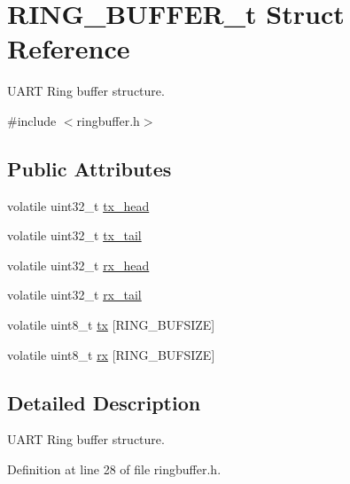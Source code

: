 \hypertarget{struct_r_i_n_g___b_u_f_f_e_r__t}{\section{\-R\-I\-N\-G\-\_\-\-B\-U\-F\-F\-E\-R\-\_\-t \-Struct \-Reference}
\label{struct_r_i_n_g___b_u_f_f_e_r__t}
}


\-U\-A\-R\-T \-Ring buffer structure.  




{\ttfamily \#include $<$ringbuffer.\-h$>$}

\subsection*{\-Public \-Attributes}
\begin{DoxyCompactItemize}
\item 
volatile uint32\-\_\-t \hyperlink{struct_r_i_n_g___b_u_f_f_e_r__t_ac368c0b8959aee3fb4c3163b17adeefa}{tx\-\_\-head}
\item 
volatile uint32\-\_\-t \hyperlink{struct_r_i_n_g___b_u_f_f_e_r__t_aa1a99ec292352d5e536ba7fd7d0ff7e7}{tx\-\_\-tail}
\item 
volatile uint32\-\_\-t \hyperlink{struct_r_i_n_g___b_u_f_f_e_r__t_ada46bd9d1f401f0754f4a503fab7caf1}{rx\-\_\-head}
\item 
volatile uint32\-\_\-t \hyperlink{struct_r_i_n_g___b_u_f_f_e_r__t_aee42ce4230a94025cd416371f9e76e78}{rx\-\_\-tail}
\item 
volatile uint8\-\_\-t \hyperlink{struct_r_i_n_g___b_u_f_f_e_r__t_a762848cc03fefa39625cf84ace599946}{tx} \mbox{[}\-R\-I\-N\-G\-\_\-\-B\-U\-F\-S\-I\-Z\-E\mbox{]}
\item 
volatile uint8\-\_\-t \hyperlink{struct_r_i_n_g___b_u_f_f_e_r__t_a6551f10b0d077240ae6b92f7194a6231}{rx} \mbox{[}\-R\-I\-N\-G\-\_\-\-B\-U\-F\-S\-I\-Z\-E\mbox{]}
\end{DoxyCompactItemize}


\subsection{\-Detailed \-Description}
\-U\-A\-R\-T \-Ring buffer structure. 

\-Definition at line 28 of file ringbuffer.\-h.



